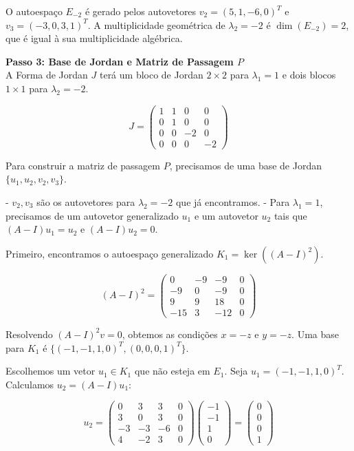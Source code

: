 O autoespaço $E_{-2}$ é gerado pelos autovetores $v_2=(5,1,-6,0)^T$ e $v_3=(-3,0,3,1)^T$. A multiplicidade geométrica de $\lambda_2=-2$ é $\dim(E_{-2})=2$, que é igual à sua multiplicidade algébrica.

\bigskip

\textbf{Passo 3: Base de Jordan e Matriz de Passagem $P$} \\

A Forma de Jordan $J$ terá um bloco de Jordan $2\times2$ para $\lambda_1=1$ e dois blocos $1\times1$ para $\lambda_2=-2$.

\[
J = \begin{pmatrix}
1 & 1 & 0 & 0 \\
0 & 1 & 0 & 0 \\
0 & 0 & -2 & 0 \\
0 & 0 & 0 & -2
\end{pmatrix}
\]

Para construir a matriz de passagem $P$, precisamos de uma base de Jordan $\{u_1,u_2,v_2,v_3\}$.

- $v_2, v_3$ são os autovetores para $\lambda_2=-2$ que já encontramos.
- Para $\lambda_1=1$, precisamos de um autovetor generalizado $u_1$ e um autovetor $u_2$ tais que $(A-I)u_1=u_2$ e $(A-I)u_2=0$.

Primeiro, encontramos o autoespaço generalizado $K_1 = \ker((A-I)^2)$.

\[
(A-I)^2 = \begin{pmatrix}
0 & -9 & -9 & 0 \\
-9 & 0 & -9 & 0 \\
9 & 9 & 18 & 0 \\
-15 & 3 & -12 & 0
\end{pmatrix}
\]

Resolvendo $(A-I)^2v=0$, obtemos as condições $x=-z$ e $y=-z$. Uma base para $K_1$ é $\{(-1,-1,1,0)^T,(0,0,0,1)^T\}$.

Escolhemos um vetor $u_1\in K_1$ que não esteja em $E_1$. Seja $u_1=(-1,-1,1,0)^T$. Calculamos $u_2=(A-I)u_1$:

\[
u_2 = \begin{pmatrix}
0 & 3 & 3 & 0 \\
3 & 0 & 3 & 0 \\
-3 & -3 & -6 & 0 \\
4 & -2 & 3 & 0
\end{pmatrix}
\begin{pmatrix}
-1 \\ -1 \\ 1 \\ 0
\end{pmatrix}
= \begin{pmatrix}
0 \\ 0 \\ 0 \\ 1
\end{pmatrix}
\]

